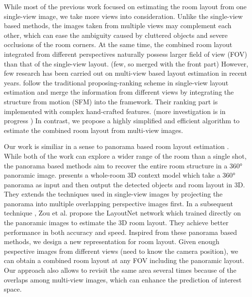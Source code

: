 %
While most of the previous work focused on estimating the room layout from one single-view image, we take more views into consideration. Unlike the single-view based methods, the images taken from multiple views may complement each other, which can ease the ambiguity caused by cluttered objects and severe occlusions of the room corners. At the same time, the combined room layout integrated from different perspectives naturally possess larger field of view (FOV) than that of the single-view layout. 
%
%
 (few, so merged with the front part) However, few research has been carried out on multi-view based layout estimation in recent years. \cite{wangmulti} follow the traditional proposing-ranking scheme in single-view layout estimation and merge the information from different views by integrating the structure from motion (SFM) into the framework. Their ranking part is implemented with complex hand-crafted features. (more investigation is in progress ) In contrast, we propose a highly simplified and efficient algorithm to estimate the combined room layout from multi-view images.

%
Our work is similiar in a sense to panorama based room layout estimation \cite{zhang2014panocontext,zou2018layoutnet}. While both of the work can explore a wider range of the room than a single shot, the panorama based methods aim to recover the entire room structure in a \ang{360} panoramic image. 
%
\cite{zhang2014panocontext} presents a whole-room 3D context model which take a \ang{360} panorama as input and then output the detected objects and room layout in 3D. They extends the techniques used in single-view images by projecting the panorama into multiple overlapping perspective images first. In a subsequent technique \cite{zou2018layoutnet}, Zou et al. propose the LayoutNet network which trained directly on the panoramic images to estimate the 3D room layout. They achieve better performance in both accuracy and speed.
%
Inspired from these panorama based methods, we design a new representation for room layout. Given enough pespective images from different views (need to know the camera position), we can obtain a combined room layout at any FOV including the panoramic layout. Our approach also allows to revisit the same area several times because of the overlaps among multi-view images, which can enhance the prediction of interest space.

